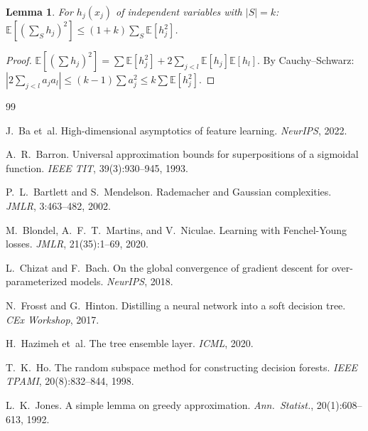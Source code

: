 \documentclass[11pt,a4paper]{article}
\newtheorem{lemma}[theorem]{Lemma}
\theoremstyle{definition}
\theoremstyle{remark}
\newcommand{\E}{\mathbb{E}}
\begin{document}
\begin{lemma}
  \label{lem:cross}
  For $h_j(x_j)$ of independent variables
  with $|S|{=}k$:
  $\E[(\sum_S h_j)^2]
  \le (1{+}k)\sum_S\E[h_j^2]$.
\end{lemma}

\begin{proof}
  $\E[(\sum h_j)^2]
  = \sum\E[h_j^2]
  + 2\sum_{j<l}\E[h_j]\E[h_l]$.
  By Cauchy--Schwarz:
  $|2\sum_{j<l}a_ja_l|
  \le (k{-}1)\sum a_j^2
  \le k\sum\E[h_j^2]$.
\end{proof}


\begin{thebibliography}{99}

J.~Ba et~al.
\newblock High-dimensional asymptotics of
  feature learning.
\newblock \emph{NeurIPS}, 2022.

A.~R.~Barron.
\newblock Universal approximation bounds for
  superpositions of a sigmoidal function.
\newblock \emph{IEEE TIT}, 39(3):930--945, 1993.

P.~L.~Bartlett and S.~Mendelson.
\newblock Rademacher and Gaussian complexities.
\newblock \emph{JMLR}, 3:463--482, 2002.

M.~Blondel, A.~F.~T.~Martins, and V.~Niculae.
\newblock Learning with Fenchel-Young losses.
\newblock \emph{JMLR}, 21(35):1--69, 2020.

L.~Chizat and F.~Bach.
\newblock On the global convergence of gradient
  descent for over-parameterized models.
\newblock \emph{NeurIPS}, 2018.

N.~Frosst and G.~Hinton.
\newblock Distilling a neural network into a
  soft decision tree.
\newblock \emph{CEx Workshop}, 2017.

H.~Hazimeh et~al.
\newblock The tree ensemble layer.
\newblock \emph{ICML}, 2020.

T.~K.~Ho.
\newblock The random subspace method for
  constructing decision forests.
\newblock \emph{IEEE TPAMI}, 20(8):832--844, 1998.

L.~K.~Jones.
\newblock A simple lemma on greedy approximation.
\newblock \emph{Ann.\ Statist.},
  20(1):608--613, 1992.


\end{thebibliography}
\end{document}
